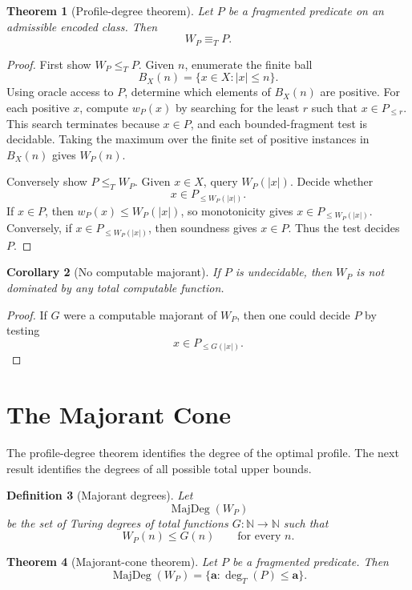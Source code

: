 \documentclass[11pt]{article}
\newtheorem{theorem}{Theorem}[section]
\newtheorem{corollary}[theorem]{Corollary}
\newtheorem{definition}[theorem]{Definition}
\begin{document}
\begin{theorem}[Profile-degree theorem]
Let \(P\) be a fragmented predicate on an admissible encoded class. Then
\[
W_P\equiv_T P.
\]
\end{theorem}

\begin{proof}
First show \(W_P\le_T P\). Given \(n\), enumerate the finite ball
\[
B_X(n)=\{x\in X:|x|\le n\}.
\]
Using oracle access to \(P\), determine which elements of \(B_X(n)\) are positive. For each positive \(x\), compute \(w_P(x)\) by searching for the least \(r\) such that \(x\in P_{\le r}\). This search terminates because \(x\in P\), and each bounded-fragment test is decidable. Taking the maximum over the finite set of positive instances in \(B_X(n)\) gives \(W_P(n)\).

Conversely show \(P\le_T W_P\). Given \(x\in X\), query \(W_P(|x|)\). Decide whether
\[
x\in P_{\le W_P(|x|)}.
\]
If \(x\in P\), then \(w_P(x)\le W_P(|x|)\), so monotonicity gives \(x\in P_{\le W_P(|x|)}\). Conversely, if \(x\in P_{\le W_P(|x|)}\), then soundness gives \(x\in P\). Thus the test decides \(P\).
\end{proof}

\begin{corollary}[No computable majorant]
If \(P\) is undecidable, then \(W_P\) is not dominated by any total computable function.
\end{corollary}

\begin{proof}
If \(G\) were a computable majorant of \(W_P\), then one could decide \(P\) by testing
\[
x\in P_{\le G(|x|)}.
\]
\end{proof}

\section{The Majorant Cone}

The profile-degree theorem identifies the degree of the optimal profile. The next result identifies the degrees of all possible total upper bounds.

\begin{definition}[Majorant degrees]
Let
\[
\operatorname{MajDeg}(W_P)
\]
be the set of Turing degrees of total functions \(G:\mathbb N\to\mathbb N\) such that
\[
W_P(n)\le G(n)
\qquad
\text{for every }n.
\]
\end{definition}

\begin{theorem}[Majorant-cone theorem]
Let \(P\) be a fragmented predicate. Then
\[
\operatorname{MajDeg}(W_P)
=
\{\mathbf a:\deg_T(P)\le \mathbf a\}.
\]
\end{theorem}
\end{document}
